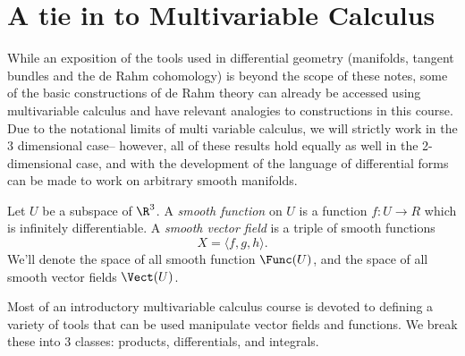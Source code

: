 
\section{A tie in to Multivariable Calculus}
While an exposition of the tools used in differential geometry (manifolds, tangent bundles and the de Rahm cohomology) is beyond the scope of these notes, some of the basic constructions of de Rahm theory can already be accessed using multivariable calculus and have relevant analogies to constructions in this course.\\
Due to the notational limits of multi variable calculus, we will strictly work in the 3 dimensional case-- however, all of these results hold equally as well in the 2-dimensional case, and with the development of the language of differential forms can be made to work on arbitrary smooth manifolds. 
\begin{definition}
	Let $U$ be a subspace of $\R^3$. A \emph{smooth function} on $U$ is a function $f: U\to R$ which is infinitely differentiable. A \emph{smooth vector field} is a triple of smooth functions 
	\[X=\langle f, g, h\rangle.\]
	We'll denote the space of all smooth function $\Func(U)$, and the space of all smooth vector fields $\Vect(U)$. 
\end{definition}
Most of an introductory multivariable calculus course is devoted to defining a variety of tools that can be used manipulate vector fields and functions. We break these into 3 classes: products, differentials, and integrals. 

